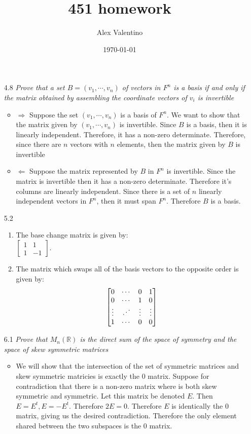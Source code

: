 \documentclass[12pt, letterpaper]{article}
\date{\today}
\author{Alex Valentino}
\title{451 homework}
\newcommand{\R}{\mathbb{R}}
\begin{document}
\begin{enumerate}
	\item[4.8] \textit{Prove that a set $B = (v_1,\cdots,v_n)$ of vectors in $F^n$ is a basis if and only if the matrix obtained by assembling the coordinate vectors of $v_i$ is invertible}
	\begin{itemize}
		\item $\Rightarrow$ Suppose the set $(v_1,\cdots,v_n)$ is a basis of $F^n$.  We want to show that the matrix given by $(v_1,\cdots,v_n)$ is invertible.  
		Since $B$ is a basis, then it is linearly independent.  Therefore, 
		it has a non-zero determinate.  Therefore, since there are $n$ vectors with $n$ elements, then the matrix given by $B$ is invertible
		\item $\Leftarrow$ Suppose the matrix represented by $B$ in $F^n$ is invertible.  Since the matrix is invertible then it has a non-zero determinate.  
		Therefore it's columns are linearly independent.  Since there is a set of $n$ linearly independent vectors in $F^n$, then it must span $F^n$.  Therefore $B$ is a basis.  
	\end{itemize}
	\item[5.2]
	\begin{enumerate}
		\item The base change matrix is given by:\\
		$\begin{bmatrix}
		1 & 1\\
		1 & -1
		\end{bmatrix}.$
		\item The matrix which swaps all of the basis vectors to the opposite order is given by:
		$$
		\begin{bmatrix}
			0 &\cdots & 0 & 1\\
			0 &\cdots & 1 & 0\\
			\vdots  & \reflectbox{$\ddots$}& \vdots & \vdots\\
			1& \cdots & 0 & 0
		\end{bmatrix}
		$$
	\end{enumerate}
	\item[6.1] \textit{Prove that $M_n(\R)$ is the direct sum of the space of symmetry and the space of skew symmetric matrices}
	\begin{itemize}
		\item We will show that the intersection of the set of symmetric matrices and skew symmetric matricies is exactly the 0 matrix.  Suppose for contradiction that there is a non-zero matrix where is both skew symmetric and symmetric.  Let this matrix be denoted $E$.  Then $E = E^t, E = -E^t$.  Therefore $2E = 0$.  Therefore $E$ is identically the 0 matrix, giving us the desired contradiction.  Therefore the only element shared between the two subspaces is the 0 matrix.

\end{itemize}
\end{enumerate}
\end{document}
